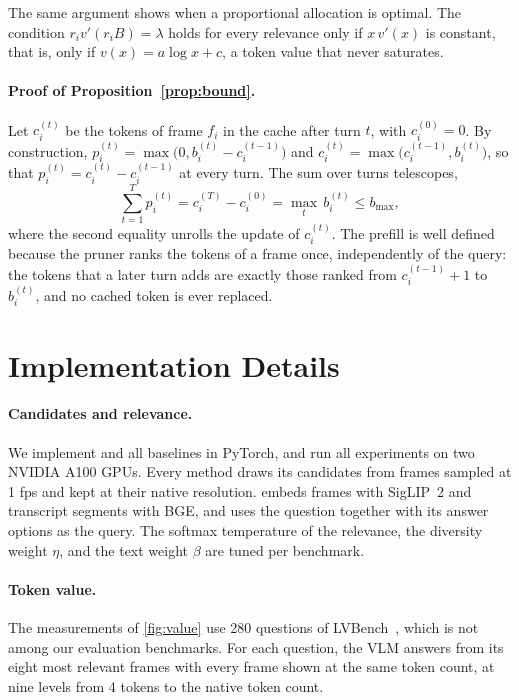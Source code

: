 The same argument shows when a proportional allocation is optimal. The condition $r_iv'(r_iB)=\lambda$ holds for
every relevance only if $x\,v'(x)$ is constant, that is, only if $v(x)=a\log x+c$, a token value that never
saturates.

\paragraph{Proof of Proposition~\ref{prop:bound}.}
Let $c_i^{(t)}$ be the tokens of frame $f_i$ in the cache after turn $t$, with $c_i^{(0)}=0$. By construction,
$p_i^{(t)}=\max\big(0,b_i^{(t)}-c_i^{(t-1)}\big)$ and $c_i^{(t)}=\max\big(c_i^{(t-1)},b_i^{(t)}\big)$, so that
$p_i^{(t)}=c_i^{(t)}-c_i^{(t-1)}$ at every turn. The sum over turns telescopes,
\begin{equation*}
  \sum_{t=1}^{T}p_i^{(t)}=c_i^{(T)}-c_i^{(0)}=\max_{t}\,b_i^{(t)}\le b_{\max} ,
\end{equation*}
where the second equality unrolls the update of $c_i^{(t)}$. The prefill is well defined because the pruner ranks the
tokens of a frame once, independently of the query: the tokens that a later turn adds are exactly those ranked from
$c_i^{(t-1)}+1$ to $b_i^{(t)}$, and no cached token is ever replaced.

\section{Implementation Details}
\label{app:impl}

\paragraph{Candidates and relevance.} We implement \name and all baselines in PyTorch, and run all experiments on
two NVIDIA A100 GPUs. Every method draws its candidates from frames sampled at 1 fps and kept at their
native resolution. \name embeds frames with SigLIP~2 and transcript segments with BGE, and uses the question together
with its answer options as the query. The softmax temperature of the relevance, the diversity weight $\eta$, and the
text weight $\beta$ are tuned per benchmark.

\paragraph{Token value.} The measurements of \cref{fig:value} use 280 questions of LVBench~\cite{wang2024lvbench},
which is not among our evaluation benchmarks. For each question, the VLM answers from its eight most relevant frames
with every frame shown at the same token count, at nine levels from 4 tokens to the native token count.


